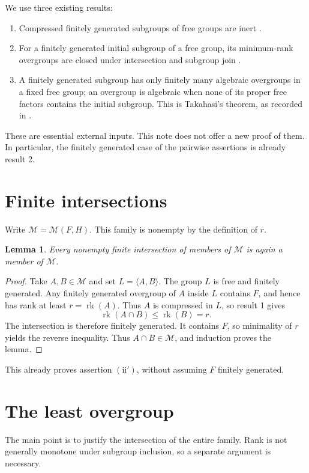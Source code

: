 \documentclass[11pt,a4paper]{article}
\newtheorem{lemma}[theorem]{Lemma}
\theoremstyle{remark}\newtheorem*{remark}{Remark}
\newcommand{\rk}{\operatorname{rk}}
\newcommand{\M}{\mathcal M}
\newcommand{\gen}[1]{\langle #1\rangle}
\begin{document}
We use three existing results:
\begin{enumerate}[label=\textbf{\arabic*.}]
\item Compressed finitely generated subgroups of free groups are inert \cite[Corollary 1.2]{JZ}.
\item For a finitely generated initial subgroup of a free group, its minimum-rank overgroups are closed under intersection and subgroup join \cite[Corollary 1.5]{JZ}.
\item A finitely generated subgroup has only finitely many algebraic overgroups in a fixed free group; an overgroup is algebraic when none of its proper free factors contains the initial subgroup. This is Takahasi's theorem, as recorded in \cite[Proposition 2.3]{JZ}.
\end{enumerate}
These are essential external inputs. This note does not offer a new proof of them. In particular, the finitely generated case of the pairwise assertions is already result 2.

\section{Finite intersections}
Write $\M=\M(F,H)$. This family is nonempty by the definition of $r$.
\begin{lemma}\label{lem:finite}
Every nonempty finite intersection of members of $\M$ is again a member of $\M$.
\end{lemma}
\begin{proof}
Take $A,B\in\M$ and set $L=\gen{A,B}$. The group $L$ is free and finitely generated. Any finitely generated overgroup of $A$ inside $L$ contains $F$, and hence has rank at least $r=\rk(A)$. Thus $A$ is compressed in $L$, so result 1 gives
\[
\rk(A\cap B)\le\rk(B)=r.
\]
The intersection is therefore finitely generated. It contains $F$, so minimality of $r$ yields the reverse inequality. Thus $A\cap B\in\M$, and induction proves the lemma.
\end{proof}
This already proves assertion $(\mathrm{ii}')$, without assuming $F$ finitely generated.

\section{The least overgroup}
The main point is to justify the intersection of the entire family. Rank is not generally monotone under subgroup inclusion, so a separate argument is necessary.
\end{document}
